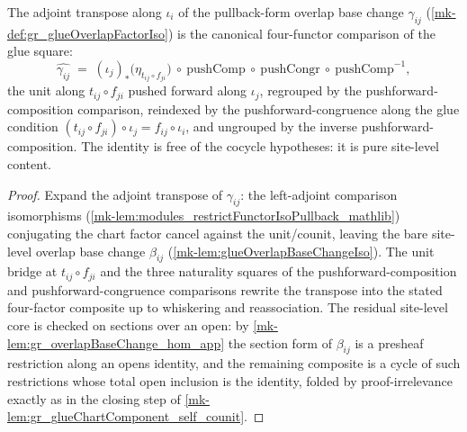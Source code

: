 \begin{lemma}\label{mk-lem:gr_glueOverlapFactor_transpose}
  \leanok

  The adjoint transpose along \(\iota_i\) of the pullback-form overlap base change
  \(\gamma_{ij}\) (\ref{mk-def:gr_glueOverlapFactorIso}) is the canonical four-functor
  comparison of the glue square:
  \[
    \widehat{\gamma_{ij}}
      \;=\;
    (\iota_j)_{*}\bigl(\eta_{t_{ij}\circ f_{ji}}\bigr)
      \ \circ\ \mathrm{pushComp}
      \ \circ\ \mathrm{pushCongr}
      \ \circ\ \mathrm{pushComp}^{-1},
  \]
  the unit along \(t_{ij}\circ f_{ji}\) pushed forward along \(\iota_j\), regrouped by
  the pushforward-composition comparison, reindexed by the pushforward-congruence along
  the glue condition \((t_{ij}\circ f_{ji})\circ \iota_j = f_{ij}\circ \iota_i\), and
  ungrouped by the inverse pushforward-composition. The identity is free of the
  cocycle hypotheses: it is pure site-level content.
\end{lemma}
\begin{proof}
  \leanok
    Expand the adjoint transpose of \(\gamma_{ij}\): the left-adjoint comparison
  isomorphisms (\ref{mk-lem:modules_restrictFunctorIsoPullback_mathlib}) conjugating the
  chart factor cancel against the unit/counit, leaving the bare site-level overlap base
  change \(\beta_{ij}\) (\ref{mk-lem:glueOverlapBaseChangeIso}). The unit bridge at
  \(t_{ij}\circ f_{ji}\) and the three naturality squares of the pushforward-composition
  and pushforward-congruence comparisons rewrite the transpose into the stated
  four-factor composite up to whiskering and reassociation. The residual site-level
  core is checked on sections over an open: by \ref{mk-lem:gr_overlapBaseChange_hom_app}
  the section form of \(\beta_{ij}\) is a presheaf restriction along an opens identity,
  and the remaining composite is a cycle of such restrictions whose total open
  inclusion is the identity, folded by proof-irrelevance exactly as in the closing step
  of \ref{mk-lem:gr_glueChartComponent_self_counit}.
\end{proof}

